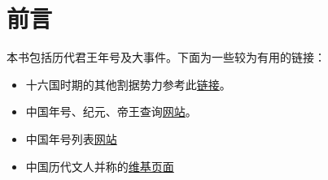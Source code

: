 
\chapter{前言}

本书包括历代君王年号及大事件。下面为一些较为有用的链接：

\begin{itemize}
  \small \kaiti
  \item 十六国时期的其他割据势力参考此\href{https://zh.wikipedia.org/wiki/%E4%BA%94%E8%83%A1%E5%8D%81%E5%85%AD%E5%9B%BD#%E5%85%B6%E4%BB%96}{链接}。
  \item 中国年号、纪元、帝王查询\href{http://www.chinese-artists.net/year/}{网站}。
  \item 中国年号列表\href{https://zh.wikipedia.org/wiki/%E4%B8%AD%E5%9B%BD%E5%B9%B4%E5%8F%B7%E5%88%97%E8%A1%A8}{网站}
    \item 中国历代文人并称的\href{https://zh.wikipedia.org/wiki/%E4%B8%AD%E5%9C%8B%E6%AD%B7%E4%BB%A3%E6%96%87%E4%BA%BA%E4%B8%A6%E7%A8%B1}{维基页面}
\end{itemize}

